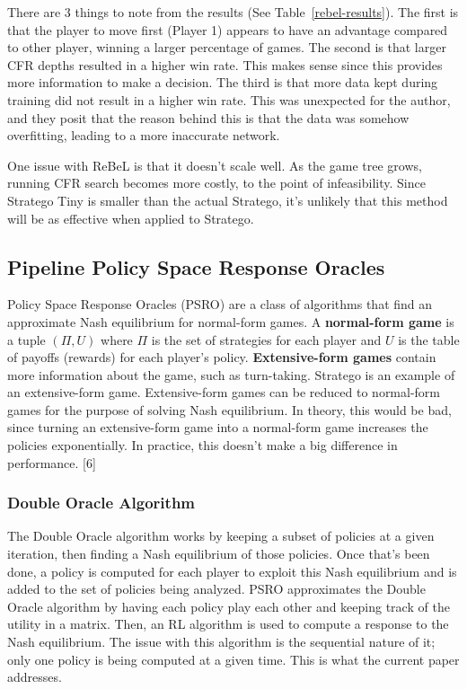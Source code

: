 \documentclass{article}
\begin{document}
There are 3 things to note from the results (See Table~\ref{rebel-results}). The first is that the player to move first (Player 1) appears to have an advantage compared to other player, winning a larger percentage of games. 
The second is that larger CFR depths resulted in a higher win rate. This makes sense since this provides more information to make a decision. The third is that more data kept during training did not result in a higher win rate. 
This was unexpected for the author, and they posit that the reason behind this is that the data was somehow overfitting, leading to a more inaccurate network. 

One issue with ReBeL is that it doesn’t scale well. As the game tree grows, running CFR search becomes more costly, to the point of infeasibility. 
Since Stratego Tiny is smaller than the actual Stratego, it’s unlikely that this method will be as effective when applied to Stratego. 

\subsection{Pipeline Policy Space Response Oracles}

Policy Space Response Oracles (PSRO) are a class of algorithms that find an approximate Nash equilibrium for normal-form games. A \textbf{normal-form game} is a tuple $(\Pi, U)$ where $\Pi$ is the set of strategies for each player and $U$ is the table of payoffs (rewards) for each player’s policy. 
\textbf{Extensive-form games} contain more information about the game, such as turn-taking. Stratego is an example of an extensive-form game. 
Extensive-form games can be reduced to normal-form games for the purpose of solving Nash equilibrium. 
In theory, this would be bad, since turning an extensive-form game into a normal-form game increases the policies exponentially. In practice, this doesn’t make a big difference in performance. [6]

\subsubsection{Double Oracle Algorithm}

The Double Oracle algorithm works by keeping a subset of policies at a given iteration, then finding a Nash equilibrium of those policies. 
Once that’s been done, a policy is computed for each player to exploit this Nash equilibrium and is added to the set of policies being analyzed. 
PSRO approximates the Double Oracle algorithm by having each policy play each other and keeping track of the utility in a matrix. 
Then, an RL algorithm is used to compute a response to the Nash equilibrium. The issue with this algorithm is the sequential nature of it; only one policy is being computed at a given time. 
This is what the current paper addresses. 
\end{document}
